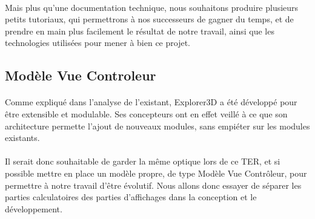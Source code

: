 \paragraph{}
Mais plus qu'une documentation technique, nous souhaitons produire plusieurs petits tutoriaux, qui permettrons à nos successeurs de gagner du temps, et de prendre en main plus facilement le résultat de notre travail, ainsi que les technologies utilisées pour mener à bien ce projet.

\subsection{Modèle Vue Controleur}
\paragraph{}
Comme expliqué dans l'analyse de l'existant, Explorer3D a été développé pour être extensible et modulable. Ses concepteurs ont en effet veillé à ce que son architecture permette l'ajout de nouveaux modules, sans empiéter sur les modules existants.

\paragraph{}
Il serait donc souhaitable de garder la même optique lors de ce TER, et si possible mettre en place un modèle propre, de type Modèle Vue Contrôleur, pour permettre à notre travail d’être évolutif. Nous allons donc essayer de séparer les parties calculatoires des parties d'affichages dans la conception et le développement.
\newpage